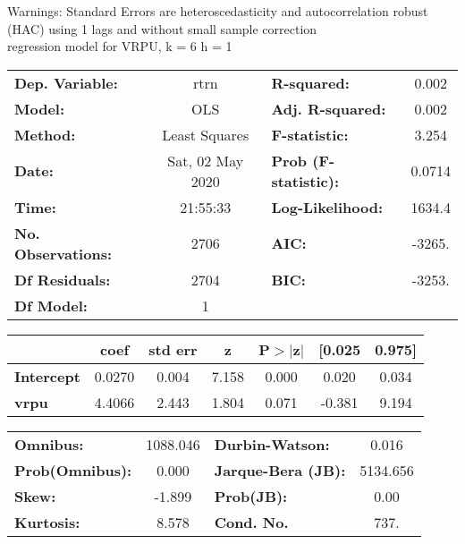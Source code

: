 Warnings: \newline
 [1] Standard Errors are heteroscedasticity and autocorrelation robust (HAC) using 1 lags and without small sample correction\\ 

regression model for VRPU, k = 6 h = 1\begin{center}
\begin{tabular}{lclc}
\toprule
\textbf{Dep. Variable:}    &       rtrn       & \textbf{  R-squared:         } &     0.002   \\
\textbf{Model:}            &       OLS        & \textbf{  Adj. R-squared:    } &     0.002   \\
\textbf{Method:}           &  Least Squares   & \textbf{  F-statistic:       } &     3.254   \\
\textbf{Date:}             & Sat, 02 May 2020 & \textbf{  Prob (F-statistic):} &   0.0714    \\
\textbf{Time:}             &     21:55:33     & \textbf{  Log-Likelihood:    } &    1634.4   \\
\textbf{No. Observations:} &        2706      & \textbf{  AIC:               } &    -3265.   \\
\textbf{Df Residuals:}     &        2704      & \textbf{  BIC:               } &    -3253.   \\
\textbf{Df Model:}         &           1      & \textbf{                     } &             \\
\bottomrule
\end{tabular}
\begin{tabular}{lcccccc}
                   & \textbf{coef} & \textbf{std err} & \textbf{z} & \textbf{P$> |$z$|$} & \textbf{[0.025} & \textbf{0.975]}  \\
\midrule
\textbf{Intercept} &       0.0270  &        0.004     &     7.158  &         0.000        &        0.020    &        0.034     \\
\textbf{vrpu}      &       4.4066  &        2.443     &     1.804  &         0.071        &       -0.381    &        9.194     \\
\bottomrule
\end{tabular}
\begin{tabular}{lclc}
\textbf{Omnibus:}       & 1088.046 & \textbf{  Durbin-Watson:     } &    0.016  \\
\textbf{Prob(Omnibus):} &   0.000  & \textbf{  Jarque-Bera (JB):  } & 5134.656  \\
\textbf{Skew:}          &  -1.899  & \textbf{  Prob(JB):          } &     0.00  \\
\textbf{Kurtosis:}      &   8.578  & \textbf{  Cond. No.          } &     737.  \\
\bottomrule
\end{tabular}
\end{center}

